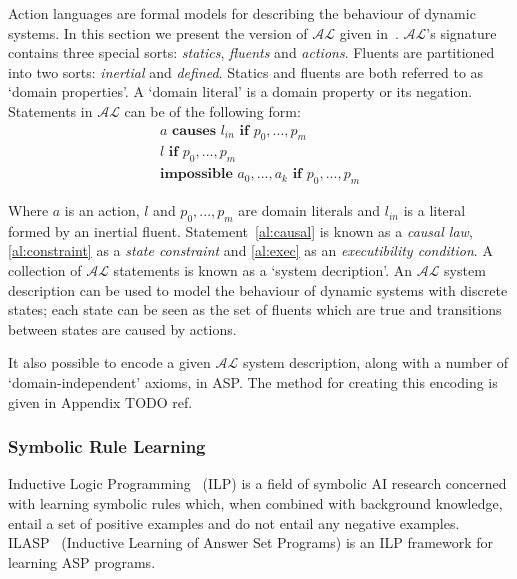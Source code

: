 \documentclass[../interim.tex]{subfiles}
\begin{document}
Action languages are formal models for describing the behaviour of dynamic systems. In this section we present the version of $\mathcal{AL}$ given in~\cite{krr-asp-book}. $\mathcal{AL}$'s signature contains three special sorts: \textit{statics}, \textit{fluents} and \textit{actions}. Fluents are partitioned into two sorts: \textit{inertial} and \textit{defined}. Statics and fluents are both referred to as `domain properties'. A `domain literal' is a domain property or its negation. Statements in $\mathcal{AL}$ can be of the following form:
\begin{gather}
  a \textbf{ causes } l_{in} \textbf{ if } p_0,...,p_m \label{al:causal} \\
  l \textbf{ if } p_0,...,p_m \label{al:constraint} \\
  \textbf{impossible } a_0,...,a_k \textbf{ if } p_0,...,p_m \label{al:exec}
\end{gather}

Where $a$ is an action, $l$ and $p_0,...,p_m$ are domain literals and $l_{in}$ is a literal formed by an inertial fluent. Statement~\ref{al:causal} is known as a \textit{causal law}, \ref{al:constraint} as a \textit{state constraint} and \ref{al:exec} as an \textit{executibility condition}. A collection of $\mathcal{AL}$ statements is known as a `system decription'. An $\mathcal{AL}$ system description can be used to model the behaviour of dynamic systems with discrete states; each state can be seen as the set of fluents which are true and transitions between states are caused by actions.

It also possible to encode a given $\mathcal{AL}$ system description, along with a number of `domain-independent' axioms, in ASP. The method for creating this encoding is given in Appendix TODO ref. %

\subsubsection{Symbolic Rule Learning}

Inductive Logic Programming~\cite{ilp-intro} (ILP) is a field of symbolic AI research concerned with learning symbolic rules which, when combined with background knowledge, entail a set of positive examples and do not entail any negative examples. ILASP~\cite{ilasp-system} (Inductive Learning of Answer Set Programs) is an ILP framework for learning ASP programs.
\end{document}
